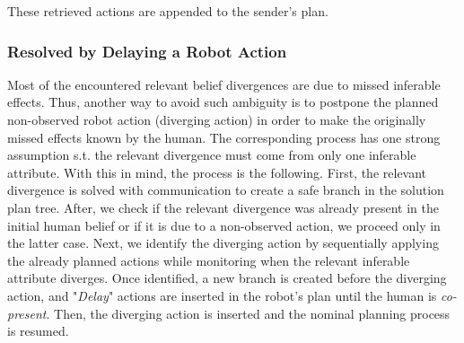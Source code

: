 \documentclass[letterpaper]{article} %
\begin{document}
These retrieved actions are appended to the sender's plan.

\subsubsection{Resolved by Delaying a Robot Action}

Most of the encountered relevant belief divergences are due to missed inferable effects. 
Thus, another way to avoid such ambiguity is to postpone the planned non-observed robot action (diverging action) in order to make the originally missed effects known by the human. The corresponding process has one strong assumption s.t. the relevant divergence must come from only one inferable attribute. With this in mind, the process is the following. 
First, the relevant divergence is solved with communication to create a safe branch in the solution plan tree. After, we check if the relevant divergence was already present in the initial human belief or if it is due to a non-observed action, we proceed only in the latter case. Next, we identify the diverging action by sequentially applying the already planned actions while monitoring when the relevant inferable attribute diverges. Once identified, a new branch is created before the diverging action, and "\textit{Delay}" actions are inserted in the robot's plan until the human is \textit{co-present}. Then, the diverging action is inserted and the nominal planning process is resumed.
\end{document}
